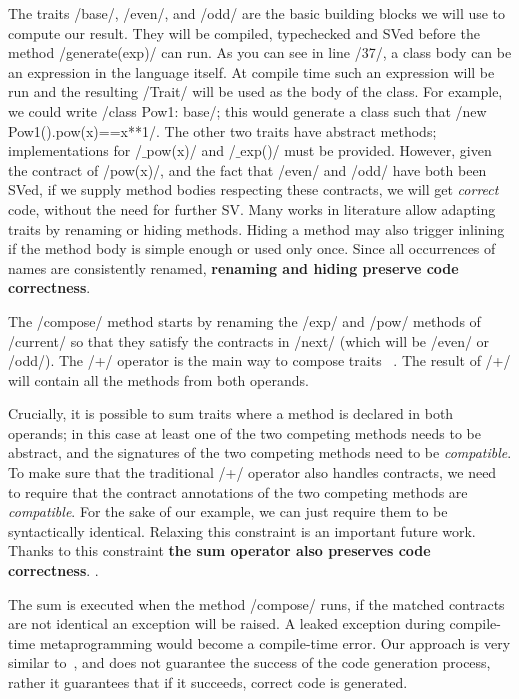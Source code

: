 The traits /base/, /even/, and /odd/ are the basic building blocks we will use to compute our result. They will be compiled, typechecked and SVed before the method /generate(exp)/ can run.
As you can see in line /37/, a class body can be an expression in the language itself.
At compile time such an expression will be run and the resulting /Trait/ will be used as the body of the class.
For example, we could write /class Pow1: base/; this would generate a class such that /new Pow1().pow(x)==x**1/.
The other two traits have abstract methods; implementations for /$\_$pow(x)/ and /$\_$exp()/ must be provided. However, given the contract of /pow(x)/,
and the fact that /even/ and /odd/ have both been SVed,
if we supply method bodies respecting these contracts, we will get \emph{correct} code, without the need for further SV.
Many works in literature allow adapting traits by renaming or hiding methods\cite{servetto2014meta,reppy2007metaprogramming,liquori2008feathertrait}. Hiding a method may also trigger inlining if the method body is simple enough or used only once.
Since all occurrences of names are consistently renamed, \textbf{renaming and hiding preserve code correctness}.

The /compose/ method starts by renaming the /exp/ and /pow/ methods of /current/
so that they satisfy the contracts in /next/ (which will be 
/even/ or /odd/).
The /+/ operator is the main way to compose traits%
~\cite{scharli2003traits,LagorioSZ09}.
The result of /+/ will contain all the methods from both operands. 

Crucially, it is possible to sum traits where a method is declared in both operands; in this case at least one of the two competing methods needs to be abstract, and the signatures of the two competing methods need to be \emph{compatible}.
To make sure that the traditional /+/ operator also handles contracts, we need to require that the contract annotations of the two competing methods  are \emph{compatible}.
For the sake of our example, we can just require them to be syntactically identical. Relaxing this constraint is an important future work.
Thanks to this constraint \textbf{the sum operator also preserves code correctness}. .

The sum is executed when the method /compose/ runs, if the matched contracts are not identical an exception will be raised. A leaked exception during compile-time metaprogramming would become a compile-time error. 
Our approach is very similar to~\cite{servetto2014meta}, and does not guarantee the success of the code generation process, rather it guarantees that if it succeeds, correct code is generated.

